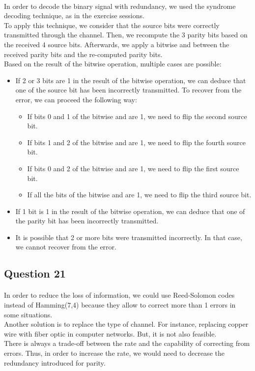 \documentclass[a4paper, 11pt, oneside]{article}
\begin{document}
\paragraph{}In order to decode the binary signal with redundancy, we used the syndrome decoding technique, as in the exercise sessions.\\
To apply this technique, we consider that the source bits were correctly transmitted through the channel. Then, we recompute the 3 parity bits based on the received 4 source bits.
Afterwards, we apply a bitwise and between the received parity bits and the re-computed parity bits.\\
Based on the result of the bitwise operation, multiple cases are possible:
\begin{itemize}
    \item If 2 or 3 bits are 1 in the result of the bitwise operation, we can deduce that one of the source bit has been incorrectly transmitted.
    To recover from the error, we can proceed the following way:
        \begin{itemize}
            \item If bits 0 and 1 of the bitwise and are 1, we need to flip the second source bit.
            \item If bits 1 and 2 of the bitwise and are 1, we need to flip the fourth source bit.
            \item If bits 0 and 2 of the bitwise and are 1, we need to flip the first source bit.
            \item If all the bits of the bitwise and are 1, we need to flip the third source bit.
        \end{itemize}
    \item If 1 bit is 1 in the result of the bitwise operation, we can deduce that one of the parity bit has been incorrectly transmitted.
    \item It is possible that 2 or more bits were transmitted incorrectly. In that case, we cannot recover from the error.
\end{itemize}


\subsection{Question 21}
\paragraph{}In order to reduce the loss of information, we could use Reed-Solomon codes instead of Hamming(7,4) because they allow to correct more than 1 errors
in some situations.\\
Another solution is to replace the type of channel. For instance, replacing copper wire with fiber optic in computer networks.
But, it is not also feasible.\\
There is always a trade-off between the rate and the capability of correcting from errors. Thus, in order to increase the rate,
we would need to decrease the redundancy introduced for parity.

\end{document}
